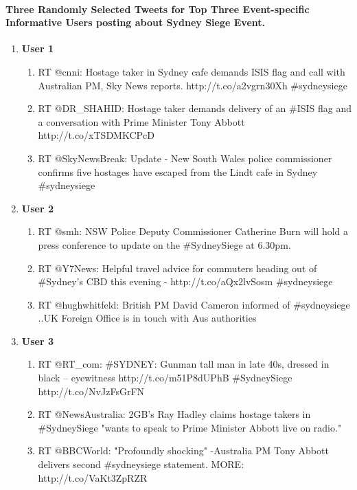 \paragraph{Three Randomly Selected Tweets for Top Three Event-specific Informative Users posting about Sydney Siege Event.}
\begin{enumerate}
\item \textbf{User 1}
\begin{enumerate}
\item RT @cnni: Hostage taker in Sydney cafe demands ISIS flag and call with Australian PM, Sky News reports. http://t.co/a2vgrn30Xh \#sydneysiege
\item RT @DR\_SHAHID: Hostage taker demands delivery of an \#ISIS flag and a conversation with Prime Minister Tony Abbott http://t.co/xTSDMKCPcD
\item RT @SkyNewsBreak: Update - New South Wales police commissioner confirms five hostages have escaped from the Lindt cafe in Sydney \#sydneysiege
\end{enumerate}

\item \textbf{User 2}
\begin{enumerate}
\item RT @smh: NSW Police Deputy Commissioner Catherine Burn will hold a press conference to update on the \#SydneySiege at 6.30pm.
\item RT @Y7News: Helpful travel advice for commuters heading out of \#Sydney’s CBD this evening - http://t.co/aQx2lvSosm \#sydneysiege
\item RT @hughwhitfeld: British PM David Cameron informed of \#sydneysiege ..UK Foreign Office is in touch with Aus authorities
\end{enumerate}

\item \textbf{User 3}
\begin{enumerate}
\item RT @RT\_com: \#SYDNEY: Gunman tall man in late 40s, dressed in black – eyewitness http://t.co/m51P8dUPhB \#SydneySiege http://t.co/NvJzFsGrFN
\item RT @NewsAustralia: 2GB's Ray Hadley claims hostage takers in \#SydneySiege "wants to speak to Prime Minister Abbott live on radio."
\item RT @BBCWorld: "Profoundly shocking" -Australia PM Tony Abbott delivers second \#sydneysiege statement. MORE: http://t.co/VaKt3ZpRZR
\end{enumerate}

\end{enumerate}

